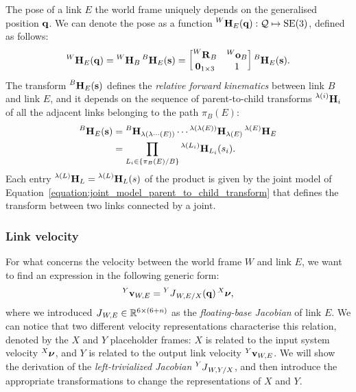 The pose of a link $E$ \wrtl the world frame uniquely depends on the generalised position $\Qu$.
We can denote the pose as a function $\homo[W]_E(\Qu): \mathcal{Q} \mapsto \SE(3)$, defined as follows:
%
\begin{equation}
    \label{eq:multibody_kinematics_pose}
    \homo[W]_E(\Qu) = \homo[W]_B \homo[B]_E(\Shape) =
    \begin{bmatrix}
        \rot[W]_B & \ori[W]_B \\
        \zeros_{1\times 3} & 1
    \end{bmatrix}
    \homo[B]_E(\Shape)
    .
\end{equation}
%
The transform $\homo[B]_E(\Shape)$ defines the \emph{relative forward kinematics} between link $B$ and link $E$, and it depends on the sequence of parent-to-child transforms $\homo[\lambda(i)]_{i}$ of all the adjacent links belonging to the path $\pi_B(E)$:
%
\begin{align*}
    \homo[B]_E(\Shape) &= \homo[B]_{\lambda(\lambda\cdots(E))} \cdots \homo[\lambda(\lambda(E))]_{\lambda(E)} \homo[\lambda(E)]_E \\
    &= \prod_{L_i \in \{\pi_B(E)/B\}} \homo[\lambda(L_i)]_{L_i}(s_i)
    .
\end{align*}
%
Each entry $\homo[\lambda(L)]_L = \homo[\lambda(L)]_L(\shape)$ of the product is given by the joint model of Equation~\eqref{equation:joint_model_parent_to_child_transform} that defines the transform between two links connected by a joint.

\subsubsection{Link velocity}

For what concerns the velocity between the world frame $W$ and link $E$, we want to find an expression in the following generic form:
%
\begin{equation*}
    \velsix[Y]_{W,E} = \jac[Y]_{W,E/X}(\Qu) \Nu[X]
    ,
\end{equation*}
%
where we introduced $\jac_{W,E} \in \realn^{6\times(6+n)}$ as the \emph{floating-base Jacobian} of link $E$.
We can notice that two different velocity representations characterise this relation, denoted by the $X$ and $Y$ placeholder frames: $X$ is related to the input system velocity $\Nu[X]$, and $Y$ is related to the output link velocity $\velsix[Y]_{W,E}$.
We will show the derivation of the \emph{left-trivialized Jacobian} $\jac[Y]_{W,Y/X}$, and then introduce the appropriate transformations to change the representations of $X$ and $Y$.

